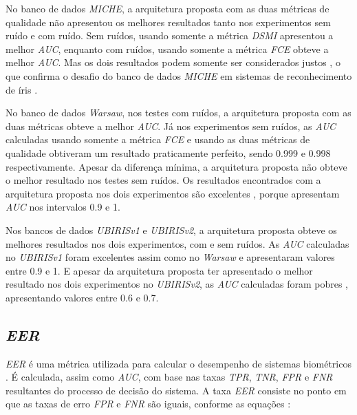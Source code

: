 \par No banco de dados \textit{MICHE}, a arquitetura proposta com as duas métricas de qualidade não apresentou os melhores resultados tanto nos experimentos sem ruído e com ruído. Sem ruídos, usando somente a métrica \textit{\acrshort{DSMI}} apresentou a melhor \textit{\acrshort{AUC}}, enquanto com ruídos, usando somente a métrica \textit{\acrshort{FCE}} obteve a melhor \textit{\acrshort{AUC}}. Mas os dois resultados podem somente ser considerados justos \cite{aucROC}, o que confirma o desafio do banco de dados \textit{MICHE} em sistemas de reconhecimento de íris \cite{marsico2017-MICHE-1}.

\par No banco de dados \textit{\acrshort{Warsaw}}, nos testes com ruídos, a arquitetura proposta com as duas métricas obteve a melhor \textit{\acrshort{AUC}}. Já nos experimentos sem ruídos, as \textit{\acrshort{AUC}} calculadas usando somente a métrica \textit{\acrshort{FCE}} e usando as duas métricas de qualidade obtiveram um resultado praticamente perfeito, sendo 0.999 e 0.998 respectivamente. Apesar da diferença mínima, a arquitetura proposta não obteve o melhor resultado nos testes sem ruídos. Os resultados encontrados com a arquitetura proposta nos dois experimentos são excelentes \cite{aucROC}, porque apresentam \textit{\acrshort{AUC}} nos intervalos 0.9 e 1.

\par Nos bancos de dados \textit{UBIRISv1} e \textit{UBIRISv2}, a arquitetura proposta obteve os melhores resultados nos dois experimentos, com e sem ruídos. As \textit{\acrshort{AUC}} calculadas no \textit{UBIRISv1} foram excelentes assim como no \textit{\acrshort{Warsaw}} e apresentaram valores entre 0.9 e 1\cite{aucROC}. E apesar da arquitetura proposta ter apresentado o melhor resultado nos dois experimentos no \textit{UBIRISv2}, as \textit{\acrshort{AUC}} calculadas foram pobres \cite{aucROC}, apresentando valores entre 0.6 e 0.7. 

\FloatBarrier

\subsection{\textit{\acrfull{EER}}} \label{sec:experimentos:eer}

\par \textit{\acrshort{EER}} é uma métrica utilizada para calcular o desempenho de sistemas biométricos \cite{eer}. É calculada, assim como \textit{\acrshort{AUC}}, com base nas taxas \textit{\acrshort{TPR}}, \textit{\acrshort{TNR}}, \textit{\acrshort{FPR}} e \textit{\acrshort{FNR}} resultantes do processo de decisão do sistema. A taxa \textit{\acrshort{EER}} consiste no ponto em que as taxas de erro \textit{\acrshort{FPR}} e \textit{\acrshort{FNR}} são iguais, conforme as equações \cite{d33BEAT}:

